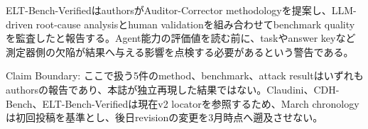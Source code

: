 ELT-Bench-VerifiedはauthorsがAuditor-Corrector methodologyを提案し、LLM-driven root-cause analysisとhuman validationを組み合わせてbenchmark qualityを監査したと報告する。Agent能力の評価値を読む前に、taskやanswer keyなど測定器側の欠陥が結果へ与える影響を点検する必要があるという警告である。\autocite{src-a27679e5527b}


\begin{claimboundary}
Claim Boundary: ここで扱う5件のmethod、benchmark、attack resultはいずれもauthorsの報告であり、本誌が独立再現した結果ではない。Claudini、CDH-Bench、ELT-Bench-Verifiedは現在v2 locatorを参照するため、March chronologyは初回投稿を基準とし、後日revisionの変更を3月時点へ遡及させない。\autocite{src-198727200361,src-4553a7bbd23e,src-5d84874f2d03,src-a27679e5527b,src-bb83c9c55568}
\end{claimboundary}
